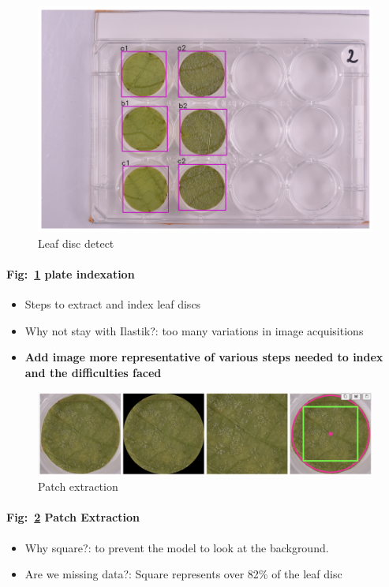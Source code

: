 \documentclass[english]{article}
\begin{document}
\begin{figure}[H]
	\centering
	\includegraphics[width=0.8\linewidth]{plate_index_v2_fixed.png}
	\caption{Leaf disc detect}\label{fig:plateindexation}
\end{figure}

\paragraph{Fig:~\ref{fig:plateindexation} plate indexation}
\begin{itemize}
	\item Steps to extract and index leaf discs
	\item Why not stay with Ilastik?: too many variations in image acquisitions
	\item \textbf{Add image more representative of various steps needed to index and the difficulties faced}
\end{itemize}

\begin{figure}[H]
	\centering
	\includegraphics[width=0.8\linewidth]{ld_detector_brute_force.png}
	\caption{Patch extraction}\label{fig:patchextraction}
\end{figure}

\paragraph{Fig:~\ref{fig:patchextraction} Patch Extraction}
\begin{itemize}
	\item Why square?: to prevent the model to look at the background.
	\item Are we missing data?: Square represents over 82\% of the leaf disc
\end{itemize}
\end{document}
